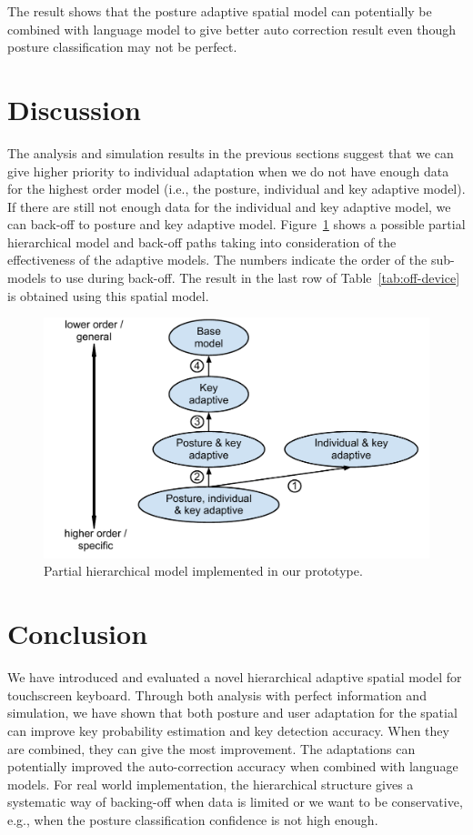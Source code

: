 \documentclass{sigchi}
\begin{document}
The result shows that the posture adaptive spatial model can potentially be combined 
with language model to give better auto correction result even though posture
classification may not be perfect.

\section{Discussion}
The analysis and simulation results in the previous sections suggest that we
can give higher priority to individual adaptation when we do not have enough data for
the highest order model (i.e., the posture, individual and key adaptive model). 
If there are still not enough data for the individual and key adaptive model, we 
can back-off to posture and key adaptive model. Figure~\ref{fig:partial-hierarchy} 
shows a possible partial hierarchical model and back-off paths taking into consideration
of the effectiveness of the adaptive models. The numbers indicate the order of the 
sub-models to use during back-off. The result in the
last row of Table~\ref{tab:off-device} is obtained using this spatial model.

\begin{figure}
  \centering
  \includegraphics[width=0.9\columnwidth]{figures/partial-hierarchy.pdf}
  \caption{Partial hierarchical model implemented in our prototype.}
  \label{fig:partial-hierarchy}
\end{figure}

\section{Conclusion}
We have introduced and evaluated a novel hierarchical adaptive spatial model for
touchscreen keyboard. Through both analysis with perfect information and simulation,
we have shown that both posture and user adaptation for the spatial can improve
key probability estimation and key detection accuracy. When they are combined, they can
give the most improvement. The adaptations can potentially
improved the auto-correction accuracy when combined with language models. For real world
implementation, the
hierarchical structure gives a systematic way of backing-off  when data is limited
or we want to be conservative, e.g., when the posture classification confidence is not 
high enough. 
\end{document}
